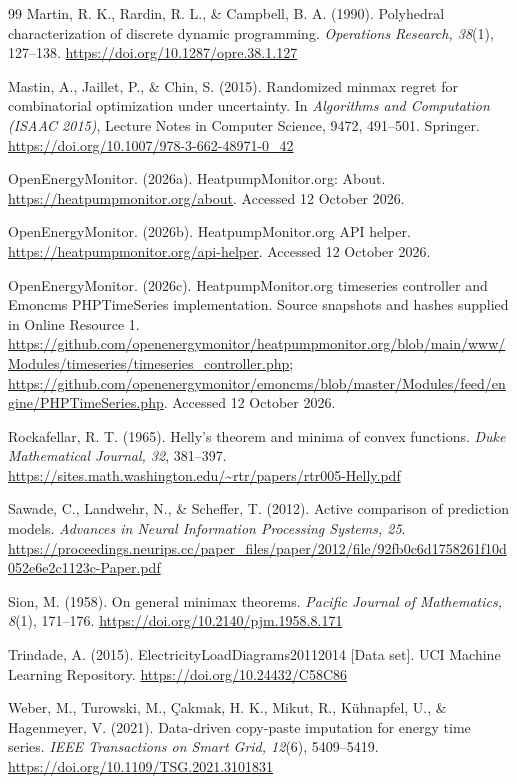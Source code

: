 \begin{thebibliography}{99}
Martin, R. K., Rardin, R. L., \& Campbell, B. A. (1990).
Polyhedral characterization of discrete dynamic programming.
\emph{Operations Research, 38}(1), 127--138.
\url{https://doi.org/10.1287/opre.38.1.127}

Mastin, A., Jaillet, P., \& Chin, S. (2015).
Randomized minmax regret for combinatorial optimization under uncertainty.
In \emph{Algorithms and Computation (ISAAC 2015)}, Lecture Notes in
Computer Science, 9472, 491--501. Springer.
\url{https://doi.org/10.1007/978-3-662-48971-0_42}

OpenEnergyMonitor. (2026a). HeatpumpMonitor.org: About.
\url{https://heatpumpmonitor.org/about}. Accessed 12 October 2026.

OpenEnergyMonitor. (2026b). HeatpumpMonitor.org API helper.
\url{https://heatpumpmonitor.org/api-helper}. Accessed 12 October 2026.

OpenEnergyMonitor. (2026c). HeatpumpMonitor.org timeseries controller and
Emoncms PHPTimeSeries implementation. Source snapshots and hashes supplied
in Online Resource 1.
\url{https://github.com/openenergymonitor/heatpumpmonitor.org/blob/main/www/Modules/timeseries/timeseries_controller.php};
\url{https://github.com/openenergymonitor/emoncms/blob/master/Modules/feed/engine/PHPTimeSeries.php}.
Accessed 12 October 2026.

Rockafellar, R. T. (1965). Helly's theorem and minima of convex functions.
\emph{Duke Mathematical Journal, 32}, 381--397.
\url{https://sites.math.washington.edu/~rtr/papers/rtr005-Helly.pdf}

Sawade, C., Landwehr, N., \& Scheffer, T. (2012).
Active comparison of prediction models.
\emph{Advances in Neural Information Processing Systems, 25}.
\url{https://proceedings.neurips.cc/paper_files/paper/2012/file/92fb0c6d1758261f10d052e6e2c1123c-Paper.pdf}

Sion, M. (1958). On general minimax theorems.
\emph{Pacific Journal of Mathematics, 8}(1), 171--176.
\url{https://doi.org/10.2140/pjm.1958.8.171}

Trindade, A. (2015). ElectricityLoadDiagrams20112014 [Data set].
UCI Machine Learning Repository.
\url{https://doi.org/10.24432/C58C86}

Weber, M., Turowski, M., \c{C}akmak, H. K., Mikut, R., K\"uhnapfel, U.,
\& Hagenmeyer, V. (2021). Data-driven copy-paste imputation for energy
time series. \emph{IEEE Transactions on Smart Grid, 12}(6), 5409--5419.
\url{https://doi.org/10.1109/TSG.2021.3101831}
\end{thebibliography}

